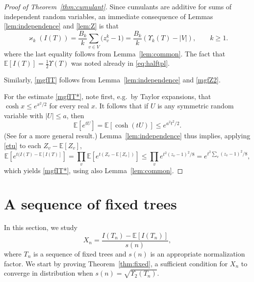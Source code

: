 \documentclass[11pt]{article}
\newcommand{\E}[1]{\mathbb{E} \left[#1\right]}
\def\U{\Upsilon}
\numberwithin{theorem}{section}
\theoremstyle{definition}
\numberwithin{equation}{section}
\newcommand{\refT}[1]{Theorem~\ref{#1}}
\newcommand{\refL}[1]{Lemma~\ref{#1}}
\newcommand\kk{\varkappa}
\newcommand\bigpar[1]{\bigl(#1\bigr)}
\begin{document}
\begin{proof}[Proof of {\refT{thm:cumulant}}]
    Since cumulants are additive 
for sums of independent random variables,
    an immediate consequence of Lemmas \ref{lem:independence} and
    \ref{lem:Z} is that
\begin{equation}
        \kk_k(I(T))=\frac{B_k}{k}
        \sum_{v\in V} \bigpar{z_v^k-1}
        = \frac{B_k}{k}(\U_k(T)-|V|)
        ,
        \qquad k\ge1.
        \label{eq:cum:z}
    \end{equation}
    where the last equality follows from \refL{lem:common}.
    The fact that $\E{I(T)}=\frac12\U(T)$ was noted already in
    \eqref{eq:halftpl}.

Similarly, \eqref{mgfIT} follows from
\refL{lem:independence} and \eqref{mgfZ2}.

For the estimate \eqref{mgfIT*}, note first, e.g.\ by Taylor expansions,
that $\cosh x \le e^{x^2/2}$ for every real $x$.
It follows that if $U$ is any symmetric random variable with $|U|\le a$,
then 
\begin{equation}\label{etu}
\E {e^{tU}}=\E {\cosh(tU)}\le e^{a^2t^2/2}.  
\end{equation}
(See \cite[(4.16)]{Hoeffding} for a more general result.)
\refL{lem:independence} thus implies,
applying \eqref{etu} to each $Z_v-\E{Z_v}$, 
\begin{equation}
  \E{e^{t(I(T)-\E{I(T)}}} 
=\prod_v\E{e^{t(Z_v-\E{Z_v})}}
\le \prod_v e^{t^2(z_v-1)^2/8}
=
e^{t^2\sum_v(z_v-1)^2/8},
\end{equation}
which yields \eqref{mgfIT*}, using also \refL{lem:common}.
\end{proof}


\section{A sequence of fixed trees}\label{sec:gen}

In this section, we study
$$
X_n 
=
\frac{I(T_n) - \E{I(T_n)}}{s(n)}
,
$$
where \(T_n\) is a sequence of fixed trees and \(s(n)\) is an appropriate normalization factor.  
We
start by proving \refT{thm:fixed}, a sufficient condition for \(X_n\) to
converge in distribution 
when \(s(n) = \sqrt{\Upsilon_{2}(T_n)}\).
\end{document}
